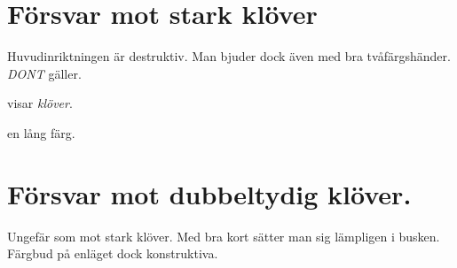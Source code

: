 \section{Försvar mot stark klöver}

Huvudinriktningen  är destruktiv. Man bjuder dock även med bra
två\-färgs\-hän\-der. \emph{DONT} gäller.

\bbe
   \item[Dubbelt] visar \emph{klöver}.
   \item[\NT{1}] en lång färg.
\ebe

\section{Försvar mot dubbeltydig klöver.}

Ungefär som mot stark klöver. Med bra kort sätter man sig lämpligen i
busken. Färgbud på enläget dock konstruktiva.

